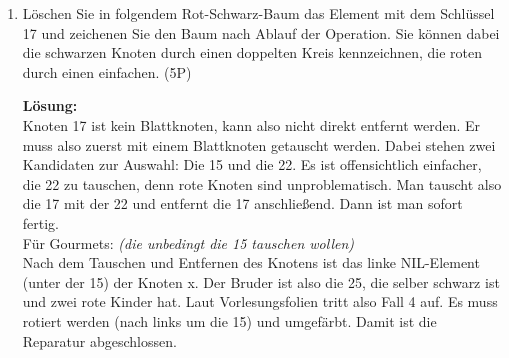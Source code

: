 \documentclass{scrartcl}
\newcommand{\nil}{N\newline I\newline L}
\begin{document}
\begin{enumerate}[(1)]
\item Löschen Sie in folgendem Rot-Schwarz-Baum das Element mit dem Schlüssel 17 und zeichenen Sie den Baum nach Ablauf der Operation. Sie können dabei die schwarzen Knoten durch einen doppelten Kreis kennzeichnen, die roten durch einen einfachen. (5P)\\

\begin{center}
\end{center}

\textbf{Lösung:} \\

Knoten 17 ist kein Blattknoten, kann also nicht direkt entfernt werden.
Er muss also zuerst mit einem Blattknoten getauscht werden. Dabei stehen zwei Kandidaten zur Auswahl:
Die 15 und die 22. Es ist offensichtlich einfacher, die 22 zu tauschen, denn rote Knoten sind unproblematisch.
Man tauscht also die 17 mit der 22 und entfernt die 17 anschließend. Dann ist man sofort fertig.\\
Für Gourmets: \textit{(die unbedingt die 15 tauschen wollen)}\\
Nach dem Tauschen und Entfernen des Knotens ist das linke NIL-Element (unter der 15) der Knoten x. Der Bruder ist also die 25, die selber schwarz ist und zwei rote Kinder hat.
Laut Vorlesungsfolien tritt also Fall 4 auf. Es muss rotiert werden (nach links um die 15) und umgefärbt. Damit ist die Reparatur abgeschlossen.

\end{enumerate}
\end{document}
